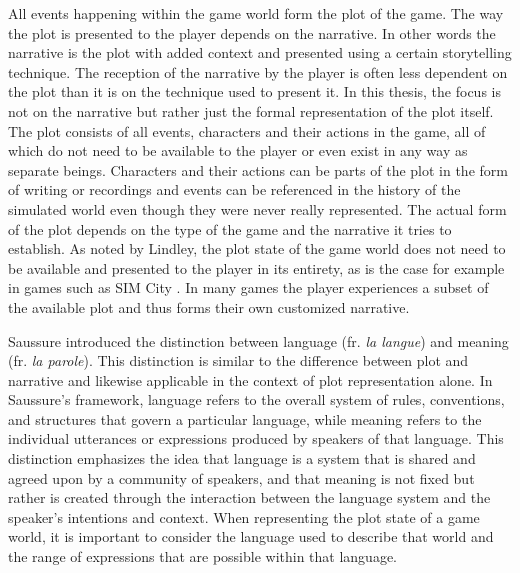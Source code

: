 \label{chapter:related}

All events happening within the game world form the plot of the game.
The way the plot is presented to the player depends on the narrative.
In other words the narrative is the plot with added context and presented using a certain storytelling technique.
The reception of the narrative by the player is often less dependent on the plot than it is on the technique used to present it.
In this thesis, the focus is not on the narrative but rather just the formal representation of the plot itself.
The plot consists of all events, characters and their actions in the game, all of which do not need to be available to the player or even exist in any way as separate beings.
Characters and their actions can be parts of the plot in the form of writing or recordings and events can be referenced in the history of the simulated world even though they were never really represented.
The actual form of the plot depends on the type of the game and the narrative it tries to establish.
As noted by Lindley, the plot state of the game world does not need to be available and presented to the player in its entirety, as is the case for example in games such as SIM City \cite{lindley2005story}.
In many games the player experiences a subset of the available plot and thus forms their own customized narrative.

Saussure\cite{gordon2004langue} introduced the distinction between language (fr. \emph{la langue}) and meaning (fr. \emph{la parole}).
This distinction is similar to the difference between plot and narrative and likewise applicable in the context of plot representation alone.
In Saussure's framework, language refers to the overall system of rules, conventions, and structures that govern a particular language, while meaning refers to the individual utterances or expressions produced by speakers of that language.
This distinction emphasizes the idea that language is a system that is shared and agreed upon by a community of speakers, and that meaning is not fixed but rather is created through the interaction between the language system and the speaker's intentions and context.
When representing the plot state of a game world, it is important to consider the language used to describe that world and the range of expressions that are possible within that language.


